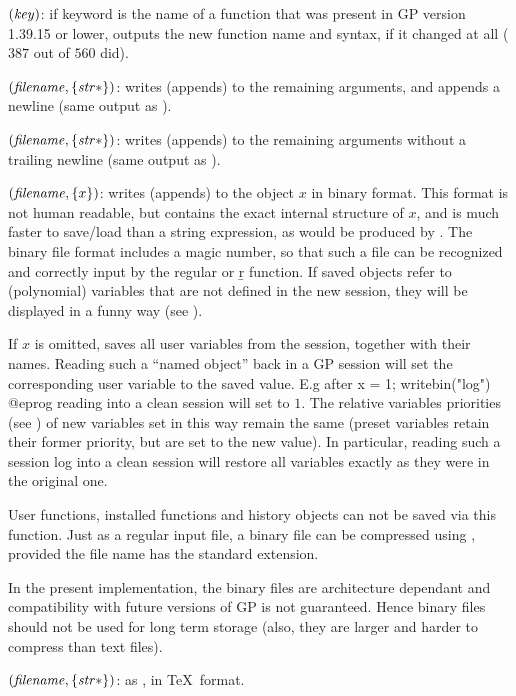 $(\hbox{\it key\/})$: if keyword  is the name
of a function that was present in GP version 1.39.15 or lower, outputs
the new function name and syntax, if it changed at all ($387$ out of $560$
did).\label{se:whatnow}

$(\hbox{\it filename\/},\{\hbox{\it str\/}*\})$: writes (appends)
to  the remaining arguments, and appends a newline (same output
as ).\label{se:write}

$(\hbox{\it filename\/},\{\hbox{\it str\/}*\})$: writes (appends) to
 the remaining arguments without a trailing newline
(same output as ).

$(\hbox{\it filename\/},\{x\})$: writes (appends) to
 the object $x$ in binary format. This format is not human
readable, but contains the exact internal structure of $x$, and is much
faster to save/load than a string expression, as would be produced by
. The binary file format includes a magic number, so that such a
file can be recognized and correctly input by the regular  or \b{r}
function. If saved objects refer to (polynomial) variables that are not
defined in the new session, they will be displayed in a funny way (see
).

If $x$ is omitted, saves all user variables from the session, together with
their names. Reading such a ``named object'' back in a GP session will set
the corresponding user variable to the saved value. E.g after
\bprog
x = 1; writebin("log")
@eprog
\noindent reading  into a clean session will set  to $1$.
The relative variables priorities (see ) of new variables
set in this way remain the same (preset variables retain their former
priority, but are set to the new value). In particular, reading such a
session log into a clean session will restore all variables exactly as they
were in the original one.

User functions, installed functions and history objects can not be saved via
this function. Just as a regular input file, a binary file can be compressed
using , provided the file name has the standard 
extension. \label{se:writebin}

In the present implementation, the binary files are architecture dependant
and compatibility with future versions of GP is not guaranteed. Hence
binary files should not be used for long term storage (also, they are
larger and harder to compress than text files).

$(\hbox{\it filename\/},\{\hbox{\it str\/}*\})$: as ,
in \TeX\ format.\label{se:writetex}

\vfill\eject
